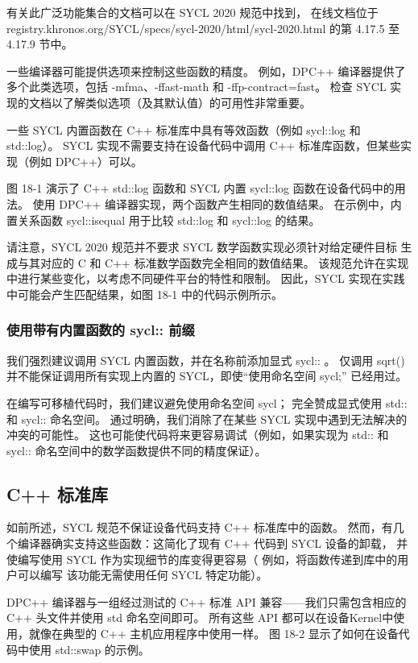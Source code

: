 有关此广泛功能集合的文档可以在 SYCL 2020 规范中找到，
在线文档位于registry.khronos.org/SYCL/specs/sycl-2020/html/sycl-2020.html 的第 4.17.5 至 4.17.9 节中。

一些编译器可能提供选项来控制这些函数的精度。 
例如，DPC++ 编译器提供了多个此类选项，包括 -mfma、-ffast-math 和 -ffp-contract=fast。 
检查 SYCL 实现的文档以了解类似选项（及其默认值）的可用性非常重要。

一些 SYCL 内置函数在 C++ 标准库中具有等效函数（例如 sycl::log 和 std::log）。 
SYCL 实现不需要支持在设备代码中调用 C++ 标准库函数，但某些实现（例如 DPC++）可以。

图 18-1 演示了 C++ std::log 函数和 SYCL 内置 sycl::log 函数在设备代码中的用法。 
使用 DPC++ 编译器实现，两个函数产生相同的数值结果。 
在示例中，内置关系函数 sycl::isequal 用于比较 std::log 和 sycl::log 的结果。

请注意，SYCL 2020 规范并不要求 SYCL 数学函数实现必须针对给定硬件目标
生成与其对应的 C 和 C++ 标准数学函数完全相同的数值结果。 
该规范允许在实现中进行某些变化，以考虑不同硬件平台的特性和限制。 
因此，SYCL 实现在实践中可能会产生匹配结果，如图 18-1 中的代码示例所示。

\subsubsection{使用带有内置函数的 sycl:: 前缀}
我们强烈建议调用 SYCL 内置函数，并在名称前添加显式 sycl:: 。 
仅调用 sqrt() 并不能保证调用所有实现上内置的 SYCL，即使“使用命名空间 sycl;” 已经用过。

在编写可移植代码时，我们建议避免使用命名空间 sycl； 完全赞成显式使用 std:: 和 sycl:: 命名空间。 
通过明确，我们消除了在某些 SYCL 实现中遇到无法解决的冲突的可能性。 
这也可能使代码将来更容易调试（例如，如果实现为 std:: 和 sycl:: 命名空间中的数学函数提供不同的精度保证）。

\subsection{C++ 标准库}
如前所述，SYCL 规范不保证设备代码支持 C++ 标准库中的函数。 
然而，有几个编译器确实支持这些函数：这简化了现有 C++ 代码到 SYCL 设备的卸载，
并使编写使用 SYCL 作为实现细节的库变得更容易（
例如，将函数传递到库中的用户可以编写 该功能无需使用任何 SYCL 特定功能）。

DPC++ 编译器与一组经过测试的 C++ 标准 API 兼容——我们只需包含相应的 C++ 头文件并使用 std 命名空间即可。 
所有这些 API 都可以在设备Kernel中使用，就像在典型的 C++ 主机应用程序中使用一样。 
图 18-2 显示了如何在设备代码中使用 std::swap 的示例。

